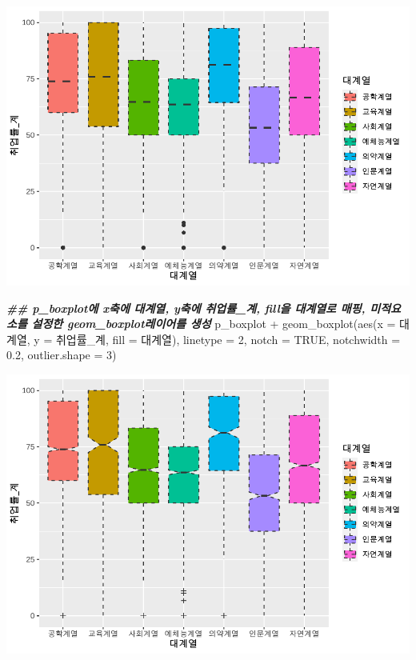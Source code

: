 \documentclass[
]{article}
\newenvironment{Shaded}{\begin{snugshade}}{\end{snugshade}}
\newcommand{\AttributeTok}[1]{\textcolor[rgb]{0.77,0.63,0.00}{#1}}
\newcommand{\ConstantTok}[1]{\textcolor[rgb]{0.00,0.00,0.00}{#1}}
\newcommand{\DecValTok}[1]{\textcolor[rgb]{0.00,0.00,0.81}{#1}}
\newcommand{\DocumentationTok}[1]{\textcolor[rgb]{0.56,0.35,0.01}{\textbf{\textit{#1}}}}
\newcommand{\FloatTok}[1]{\textcolor[rgb]{0.00,0.00,0.81}{#1}}
\newcommand{\FunctionTok}[1]{\textcolor[rgb]{0.00,0.00,0.00}{#1}}
\newcommand{\NormalTok}[1]{#1}
\newcommand{\SpecialCharTok}[1]{\textcolor[rgb]{0.00,0.00,0.00}{#1}}
\begin{document}
\includegraphics{chap3_files/figure-latex/unnamed-chunk-38-2.pdf}

\begin{Shaded}
\begin{Highlighting}[]
\DocumentationTok{\#\# p\_boxplot에 x축에 대계열, y축에 취업률\_계, fill을 대계열로 매핑, 미적요소를 설정한 geom\_boxplot레이어를 생성}
\NormalTok{p\_boxplot }\SpecialCharTok{+} 
  \FunctionTok{geom\_boxplot}\NormalTok{(}\FunctionTok{aes}\NormalTok{(}\AttributeTok{x =}\NormalTok{ 대계열, }\AttributeTok{y =}\NormalTok{ 취업률\_계, }\AttributeTok{fill =}\NormalTok{ 대계열), }\AttributeTok{linetype =} \DecValTok{2}\NormalTok{, }\AttributeTok{notch =} \ConstantTok{TRUE}\NormalTok{, }\AttributeTok{notchwidth =} \FloatTok{0.2}\NormalTok{, }\AttributeTok{outlier.shape =} \DecValTok{3}\NormalTok{) }
\end{Highlighting}
\end{Shaded}

\includegraphics{chap3_files/figure-latex/unnamed-chunk-38-3.pdf}
\end{document}
